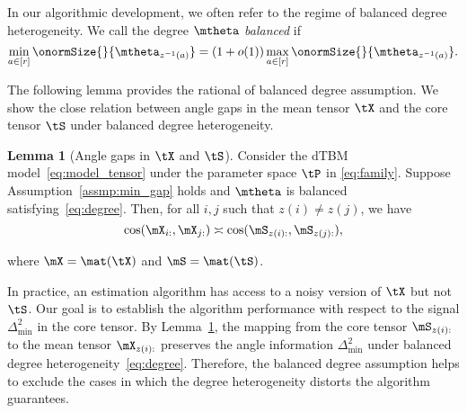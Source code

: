\documentclass[lettersize,onecolumn,journal]{IEEEtran}
\theoremstyle{definition}
\newtheorem{lem}{Lemma}
\theoremstyle{definition}
\begin{document}
{
 In our algorithmic development, we often refer to the regime of balanced degree heterogeneity. We call the degree $\mtheta$ \emph{balanced} if
\begin{equation}\label{eq:degree}
{\min_{a\in[r]} \onormSize{}{\mtheta_{z^{-1}(a)}}=\left(1+o(1)\right)\max_{a\in[r]}\onormSize{}{\mtheta_{z^{-1}(a)}}}.
\end{equation}

The following lemma provides the rational of balanced degree assumption. We show the close relation between angle gaps in the mean tensor $\tX$ and the core tensor $\tS$ under balanced degree heterogeneity. 


\begin{lem}[Angle gaps in $\tX$ and $\tS$]\label{lem:angle_gap_x} Consider the dTBM model~\eqref{eq:model_tensor} under the parameter space $\tP$ in \eqref{eq:family}. Suppose Assumption~\ref{assmp:min_gap} holds and $\mtheta$ is balanced satisfying~\eqref{eq:degree}. Then, for all $i,j$ such that $z(i) \neq z(j)$, we have
\begin{equation}
 \cos(\mX_{i:}, \mX_{j:})\asymp  \cos(\mS_{z(i):}, \mS_{z(j):}),
\end{equation}

where $\mX =\mat(\tX)$ and $\mS = \mat (\tS)$.
\end{lem}
In practice, an estimation algorithm has access to a noisy version of $\tX$ but not $\tS$. %
Our goal is to establish the algorithm performance with respect to the signal $\Delta^2_{\min}$ in the core tensor. By Lemma~\ref{lem:angle_gap_x}, the mapping from the core tensor $\mS_{z(i):}$ to the mean tensor $\mX_{z(i):}$ preserves the angle information $\Delta_{\min}^2$ under balanced degree heterogeneity~\eqref{eq:degree}. Therefore, the balanced degree assumption helps to exclude the cases in which the degree heterogeneity distorts the algorithm guarantees. 


}
\end{document}
